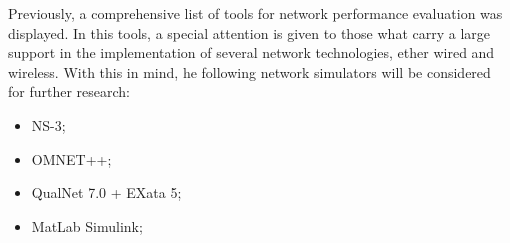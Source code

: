 Previously, a comprehensive list of tools for network performance evaluation was displayed. In this tools, a special attention is given to those what carry a large support in the implementation of several network technologies, ether wired and wireless. With this in mind, he following network simulators will be considered for further research:
	
\begin{itemize}
	\setlength\itemsep{-0.5em}
	\item NS-3;
	\item OMNET++;
	\item QualNet 7.0 + EXata 5;
	\item MatLab Simulink;
\end{itemize}



